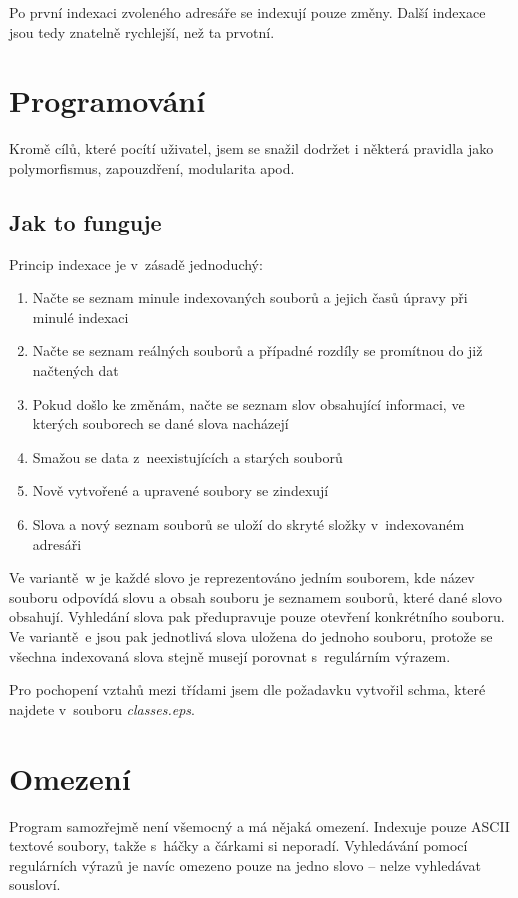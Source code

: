 \documentclass[a4paper]{article}
\begin{document}
Po první indexaci zvoleného adresáře se indexují pouze změny. Další indexace jsou tedy znatelně rychlejší, než ta prvotní.

\section{Programování}

Kromě cílů, které pocítí uživatel, jsem se snažil dodržet i některá pravidla jako polymorfismus, zapouzdření, modularita apod.

\subsection{Jak to funguje}

Princip indexace je v~zásadě jednoduchý:

\begin{enumerate}
 \item Načte se seznam minule indexovaných souborů a jejich časů úpravy při minulé indexaci
 \item Načte se seznam reálných souborů a případné rozdíly se promítnou do již načtených dat
 \item Pokud došlo ke změnám, načte se seznam slov obsahující informaci, ve kterých souborech se dané slova nacházejí
 \item Smažou se data z~neexistujících a starých souborů
 \item Nově vytvořené a upravené soubory se zindexují
 \item Slova a nový seznam souborů se uloží do skryté složky v~indexovaném adresáři
\end{enumerate}

Ve variantě~w je každé slovo je reprezentováno jedním souborem, kde název souboru odpovídá slovu a obsah souboru je seznamem souborů, které dané slovo obsahují. Vyhledání slova pak předupravuje pouze otevření konkrétního souboru. Ve variantě~e jsou pak jednotlivá slova uložena do jednoho souboru, protože se všechna indexovaná slova stejně musejí porovnat s~regulárním výrazem.

Pro pochopení vztahů mezi třídami jsem dle požadavku vytvořil schma, které najdete v~souboru \emph{classes.eps}.

\section{Omezení}

Program samozřejmě není všemocný a má nějaká omezení. Indexuje pouze ASCII textové soubory, takže s~háčky a čárkami si neporadí. Vyhledávání pomocí regulárních výrazů je navíc omezeno pouze na jedno slovo -- nelze vyhledávat sousloví.
\end{document}
